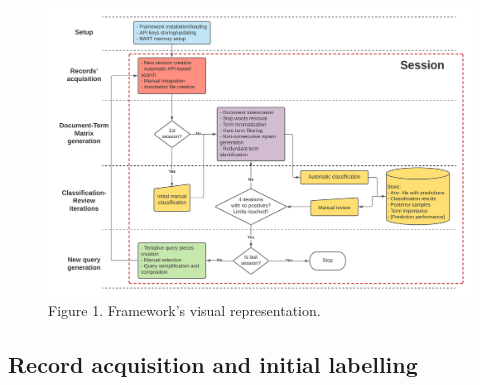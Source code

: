 \documentclass{article}
\begin{document}
\begin{figure}
\includegraphics[width=1\linewidth]{methods_diagram} \caption{Figure 1. Framework's visual representation.}\label{fig:method_diagram}
\end{figure}

\hypertarget{record-acquisition-and-initial-labelling}{%
\subsection{Record acquisition and initial
labelling}\label{record-acquisition-and-initial-labelling}}
\end{document}
